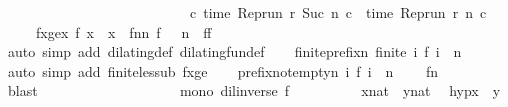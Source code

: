 \begin{isabellebody}
\ \ \ \ \ \ \ \ \ \ \ \ \ \ \ \ \ \ \ \ \ \ \ \ \ \ {\isasymlongrightarrow}\ {\isacharparenleft}{\isasymforall}c{\isachardot}\ time\ {\isacharparenleft}{\isacharparenleft}Rep{\isacharunderscore}run\ r{\isacharparenright}\ {\isacharparenleft}Suc\ n{\isacharparenright}\ c{\isacharparenright}\ {\isacharequal}\ time\ {\isacharparenleft}{\isacharparenleft}Rep{\isacharunderscore}run\ r{\isacharparenright}\ n\ c{\isacharparenright}{\isacharparenright}{\isacartoucheclose}\isanewline
\ \ \ \ \ fxge{\isacharcolon}{\isacartoucheopen}{\isasymforall}x{\isachardot}\ f\ x\ {\isasymge}\ x{\isacartoucheclose}\ \ f{}n{\isacharcolon}{\isacartoucheopen}{\isasymAnd}n{\isachardot}\ f\ {}\ {\isasymle}\ n{\isacartoucheclose}\ \ f{}{\isacharcolon}{\isacartoucheopen}f\ {}\ {\isacharequal}\ {}{\isacartoucheclose}\isanewline
\ \ \ \ \isamarkupfalse%
\ {\isacharparenleft}auto\ simp\ add{\isacharcolon}\ dilating{\isacharunderscore}def\ dilating{\isacharunderscore}fun{\isacharunderscore}def{\isacharparenright}\isanewline
\ \ \isamarkupfalse%
\ finite{\isacharunderscore}prefix{\isacharcolon}{\isacartoucheopen}{\isasymAnd}n{\isachardot}\ finite\ {\isacharbraceleft}i{\isachardot}\ f\ i\ {\isasymle}\ n{\isacharbraceright}{\isacartoucheclose}\ \isamarkupfalse%
\ {\isacharparenleft}auto\ simp\ add{\isacharcolon}\ finite{\isacharunderscore}less{\isacharunderscore}ub\ fxge{\isacharparenright}\isanewline
\ \ \isamarkupfalse%
\ prefix{\isacharunderscore}not{\isacharunderscore}empty{\isacharcolon}{\isacartoucheopen}{\isasymAnd}n{\isachardot}\ {\isacharbraceleft}i{\isachardot}\ f\ i\ {\isasymle}\ n{\isacharbraceright}\ {\isasymnoteq}\ {\isacharbraceleft}{\isacharbraceright}{\isacartoucheclose}\ \isamarkupfalse%
\ f{}n\ \isamarkupfalse%
\ blast\ \ \ \ \ \ \ \ \ \ \ \ \ \ \ \ \isanewline
\isanewline
\ \ \isamarkupfalse%
\ {}{\isacharcolon}{\isacartoucheopen}mono\ {\isacharparenleft}dil{\isacharunderscore}inverse\ f{\isacharparenright}{\isacartoucheclose}\isanewline
\ \ \isamarkupfalse%
\ {\isacharminus}\isanewline
\ \ \isacommand{{\isacharbraceleft}}\isamarkupfalse%
\ \isamarkupfalse%
\ x{\isacharcolon}{\isacharcolon}{\isacartoucheopen}nat{\isacartoucheclose}\ \ y{\isacharcolon}{\isacharcolon}{\isacartoucheopen}nat{\isacartoucheclose}\ \isamarkupfalse%
\ hyp{\isacharcolon}{\isacartoucheopen}x\ {\isasymle}\ y{\isacartoucheclose}\isanewline

\end{isabellebody}
